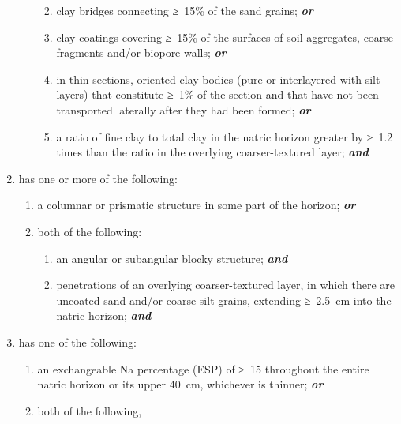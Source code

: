 \documentclass[
  letterpaper,
  DIV=11,
  numbers=noendperiod]{scrreprt}
\providecommand{\tightlist}{%
  \setlength{\itemsep}{0pt}\setlength{\parskip}{0pt}}\usepackage{longtable,booktabs,array}
\begin{document}
\begin{enumerate}
\begin{enumerate}
    \begin{enumerate}
    \def\labelenumiii{\roman{enumiii}.}
    \tightlist
    \item
      clay bridges connecting ≥~15\% of the sand grains;
      \textbf{\emph{or}}
    \item
      clay coatings covering ≥~15\% of the surfaces of soil aggregates,
      coarse fragments and/or biopore walls; \textbf{\emph{or}}
    \item
      in thin sections, oriented clay bodies (pure or interlayered with
      silt layers) that constitute ≥~1\% of the section and that have
      not been transported laterally after they had been formed;
      \textbf{\emph{or}}
    \item
      a ratio of fine clay to total clay in the natric horizon greater
      by ≥~1.2 times than the ratio in the overlying coarser-textured
      layer; \textbf{\emph{and}}
    \end{enumerate}
  \end{enumerate}
\item
  has one or more of the following:

  \begin{enumerate}
  \def\labelenumii{\alph{enumii}.}
  \tightlist
  \item
    a columnar or prismatic structure in some part of the horizon;
    \textbf{\emph{or}}
  \item
    both of the following:

    \begin{enumerate}
    \def\labelenumiii{\roman{enumiii}.}
    \tightlist
    \item
      an angular or subangular blocky structure; \textbf{\emph{and}}
    \item
      penetrations of an overlying coarser-textured layer, in which
      there are uncoated sand and/or coarse silt grains, extending
      ≥~2.5~cm into the natric horizon; \textbf{\emph{and}}
    \end{enumerate}
  \end{enumerate}
\item
  has one of the following:

  \begin{enumerate}
  \def\labelenumii{\alph{enumii}.}
  \tightlist
  \item
    an exchangeable Na percentage (ESP) of ≥~15 throughout the entire
    natric horizon or its upper 40~cm, whichever is thinner;
    \textbf{\emph{or}}
  \item
    both of the following,


\end{enumerate}
\end{enumerate}
\end{document}
